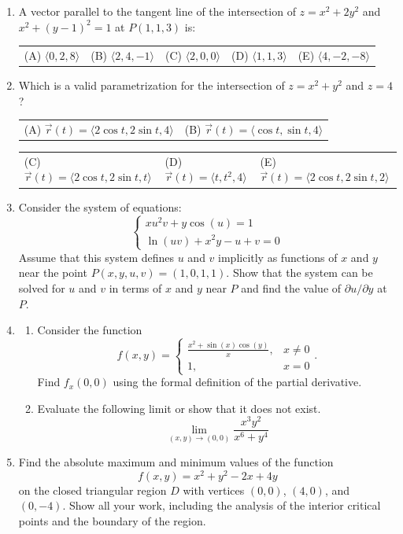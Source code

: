 \documentclass[a4paper, 12pt]{article}
\begin{document}
\begin{enumerate}[leftmargin=*,label=\textbf{\arabic*.}]
\newpage
\item A vector parallel to the tangent line of the intersection of $z = x^2 + 2y^2$ and $x^2 + (y-1)^2 = 1$ at $P(1,1,3)$ is:
\begin{center}
\begin{tabular}{lllll}
(A) $\langle 0, 2, 8 \rangle$ &
(B) $\langle 2, 4, -1 \rangle$ &
(C) $\langle 2, 0, 0 \rangle$ &
(D) $\langle 1, 1, 3 \rangle$ &
(E) $\langle 4, -2, -8 \rangle$
\end{tabular}
\end{center}

\item Which is a valid parametrization for the intersection of $z = x^2 + y^2$ and $z = 4$?
\begin{center}
\begin{tabular}{ll}
(A) $\vec{r}(t) = \langle 2\cos t, 2\sin t, 4 \rangle$ &
(B) $\vec{r}(t) = \langle \cos t, \sin t, 4 \rangle$
\end{tabular}

\begin{tabular}{lll}
(C) $\vec{r}(t) = \langle 2\cos t, 2\sin t, t \rangle$ &
(D) $\vec{r}(t) = \langle t, t^2, 4 \rangle$ &
(E) $\vec{r}(t) = \langle 2\cos t, 2\sin t, 2 \rangle$
\end{tabular}
\end{center}

\item Consider the system of equations:
\[
\begin{cases}
xu^2v + y\cos(u) = 1 \\
\ln(uv) + x^2y - u + v = 0
\end{cases}
\]
Assume that this system defines $u$ and $v$ implicitly as functions of $x$ and $y$ near the point $P(x,y,u,v) = (1,0,1,1)$.
Show that the system can be solved for $u$ and $v$ in terms of $x$ and $y$ near $P$ and find the value of $\partial u / \partial y$ at $P$.

\item \begin{enumerate}[label=\textbf{\alph*.}]
\item Consider the function
\[f(x,y) = \begin{cases}
\frac{x^2 + \sin(x)\cos(y)}{x}, & x \neq 0 \\ 
1, & x = 0 
\end{cases}.\]
Find $f_x(0,0)$ using the formal definition of the partial derivative.
    
\item Evaluate the following limit or show that it does not exist.
\[\lim_{(x,y)\to(0,0)} \frac{x^3 y^2}{x^6 + y^4}\]
\end{enumerate}

\item Find the absolute maximum and minimum values of the function
\[f(x,y) = x^2 + y^2 - 2x + 4y\]
on the closed triangular region $D$ with vertices $(0,0)$, $(4,0)$, and $(0,-4)$. Show all your work, including the analysis of the interior critical points and the boundary of the region.
\end{enumerate}
\end{document}
